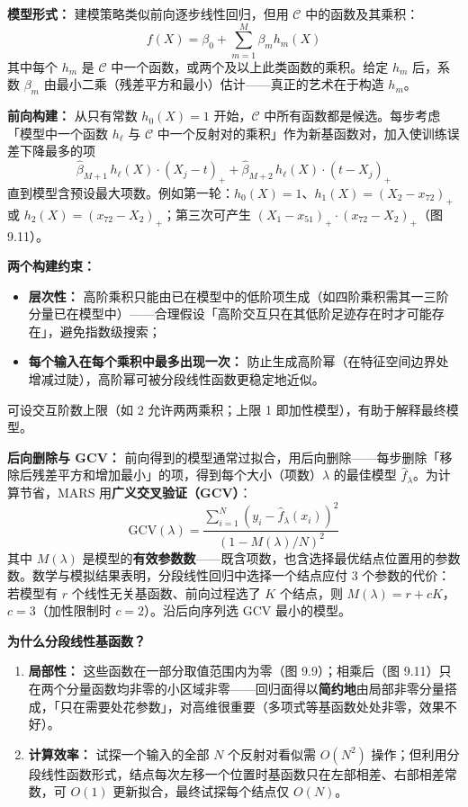 \textbf{模型形式：} 建模策略类似前向逐步线性回归，但用 $\mathcal{C}$ 中的函数及其乘积：
\begin{equation}\label{eq:9_19}
    f(X) = \beta_0 + \sum_{m=1}^{M} \beta_m h_m(X)
\end{equation}
其中每个 $h_m$ 是 $\mathcal{C}$ 中一个函数，或两个及以上此类函数的乘积。给定 $h_m$ 后，系数 $\beta_m$ 由最小二乘（残差平方和最小）估计——真正的艺术在于构造 $h_m$。

\textbf{前向构建：} 从只有常数 $h_0(X) = 1$ 开始，$\mathcal{C}$ 中所有函数都是候选。每步考虑「模型中一个函数 $h_\ell$ 与 $\mathcal{C}$ 中一个反射对的乘积」作为新基函数对，加入使训练误差下降最多的项
\[
    \hat\beta_{M+1}\,h_\ell(X)\cdot(X_j - t)_+ + \hat\beta_{M+2}\,h_\ell(X)\cdot(t - X_j)_+
\]
直到模型含预设最大项数。例如第一轮：$h_0(X) = 1$、$h_1(X) = (X_2 - x_{72})_+$ 或 $h_2(X) = (x_{72} - X_2)_+$；第三次可产生 $(X_1 - x_{51})_+\cdot(x_{72} - X_2)_+$（图 9.11）。

\textbf{两个构建约束：}
\begin{itemize}
    \item \textbf{层次性：} 高阶乘积只能由已在模型中的低阶项生成（如四阶乘积需其一三阶分量已在模型中）——合理假设「高阶交互只在其低阶足迹存在时才可能存在」，避免指数级搜索；
    \item \textbf{每个输入在每个乘积中最多出现一次：} 防止生成高阶幂（在特征空间边界处增减过陡），高阶幂可被分段线性函数更稳定地近似。
\end{itemize}
可设交互阶数上限（如 2 允许两两乘积；上限 1 即加性模型），有助于解释最终模型。

\textbf{后向删除与 GCV：} 前向得到的模型通常过拟合，用后向删除——每步删除「移除后残差平方和增加最小」的项，得到每个大小（项数）$\lambda$ 的最佳模型 $\hat f_\lambda$。为计算节省，MARS 用\textbf{广义交叉验证（GCV）}：
\begin{equation}\label{eq:9_20}
    \mathrm{GCV}(\lambda) = \frac{\sum_{i=1}^{N}(y_i - \hat f_\lambda(x_i))^2}{(1 - M(\lambda)/N)^2}
\end{equation}
其中 $M(\lambda)$ 是模型的\textbf{有效参数数}——既含项数，也含选择最优结点位置用的参数数。数学与模拟结果表明，分段线性回归中选择一个结点应付 3 个参数的代价：若模型有 $r$ 个线性无关基函数、前向过程选了 $K$ 个结点，则 $M(\lambda) = r + cK$，$c = 3$（加性限制时 $c = 2$）。沿后向序列选 GCV 最小的模型。

\textbf{为什么分段线性基函数？}
\begin{enumerate}
    \item \textbf{局部性：} 这些函数在一部分取值范围内为零（图 9.9）；相乘后（图 9.11）只在两个分量函数均非零的小区域非零——回归面得以\textbf{简约地}由局部非零分量搭成，「只在需要处花参数」，对高维很重要（多项式等基函数处处非零，效果不好）。
    \item \textbf{计算效率：} 试探一个输入的全部 $N$ 个反射对看似需 $O(N^2)$ 操作；但利用分段线性函数形式，结点每次左移一个位置时基函数只在左部相差、右部相差常数，可 $O(1)$ 更新拟合，最终试探每个结点仅 $O(N)$。
\end{enumerate}


